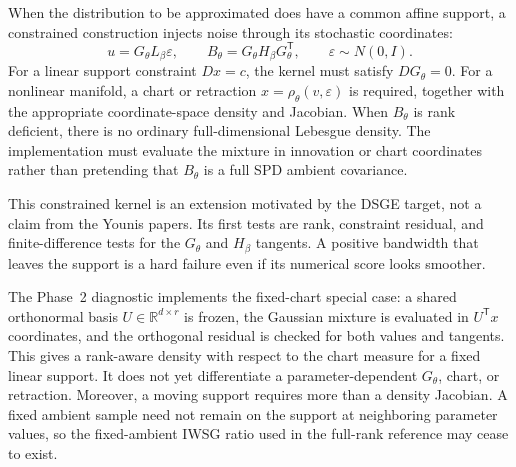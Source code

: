 \documentclass[11pt]{article}
\newcommand{\R}{\mathbb{R}}
\begin{document}
When the distribution to be approximated does have a common affine support,
a constrained construction injects noise through its stochastic coordinates:
\begin{equation}
 u=G_\theta L_\beta\varepsilon,\qquad
 B_\theta=G_\theta H_\beta G_\theta^\mathsf{T},\qquad
 \varepsilon\sim N(0,I).
 \label{eq:innovation-kernel}
\end{equation}
For a linear support constraint $D x=c$, the kernel must satisfy
$D G_\theta=0$.  For a nonlinear manifold, a chart or retraction
$x=\rho_\theta(v,\varepsilon)$ is required, together with the appropriate
coordinate-space density and Jacobian.  When $B_\theta$ is rank deficient,
there is no ordinary full-dimensional Lebesgue density.  The implementation
must evaluate the mixture in innovation or chart coordinates rather than
pretending that $B_\theta$ is a full SPD ambient covariance.

This constrained kernel is an extension motivated by the DSGE target, not a
claim from the Younis papers.  Its first tests are rank, constraint residual,
and finite-difference tests for the $G_\theta$ and $H_\beta$ tangents.  A
positive bandwidth that leaves the support is a hard failure even if its
numerical score looks smoother.

The Phase~2 diagnostic implements the fixed-chart special case: a shared
orthonormal basis $U\in\R^{d\times r}$ is frozen, the Gaussian mixture is
evaluated in $U^\mathsf{T}x$ coordinates, and the orthogonal residual is checked
for both values and tangents.  This gives a rank-aware density with respect to
the chart measure for a fixed linear support.  It does not yet differentiate a
parameter-dependent $G_\theta$, chart, or retraction.  Moreover, a moving
support requires more than a density Jacobian.  A fixed ambient sample need
not remain on the support at neighboring parameter values, so the
fixed-ambient IWSG ratio used in the full-rank reference may cease to exist.
\end{document}
